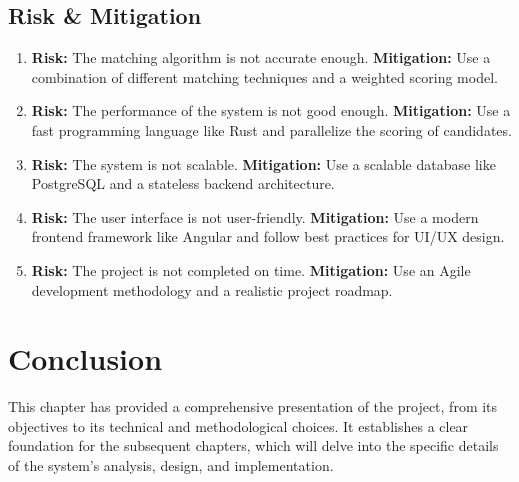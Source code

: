 \subsection{Risk \& Mitigation}
\begin{enumerate}
    \item \textbf{Risk:} The matching algorithm is not accurate enough. \textbf{Mitigation:} Use a combination of different matching techniques and a weighted scoring model.
    \item \textbf{Risk:} The performance of the system is not good enough. \textbf{Mitigation:} Use a fast programming language like Rust and parallelize the scoring of candidates.
    \item \textbf{Risk:} The system is not scalable. \textbf{Mitigation:} Use a scalable database like PostgreSQL and a stateless backend architecture.
    \item \textbf{Risk:} The user interface is not user-friendly. \textbf{Mitigation:} Use a modern frontend framework like Angular and follow best practices for UI/UX design.
    \item \textbf{Risk:} The project is not completed on time. \textbf{Mitigation:} Use an Agile development methodology and a realistic project roadmap.
\end{enumerate}

\section{Conclusion}
This chapter has provided a comprehensive presentation of the project, from its objectives to its technical and methodological choices. It establishes a clear foundation for the subsequent chapters, which will delve into the specific details of the system's analysis, design, and implementation.